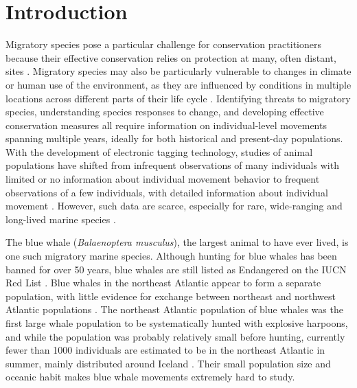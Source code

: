 \documentclass[a4paper,12pt]{article}
\begin{document}
\section{Introduction}
Migratory species pose a particular challenge for conservation practitioners because their effective conservation relies on protection at many, often distant, sites \cite{runge2014conserving}.
Migratory species may also be particularly vulnerable to changes in climate or human use of the environment, as they are influenced by conditions in multiple locations across different parts of their life cycle \cite{robinson2009travelling}. 
Identifying threats to migratory species, understanding species responses to change, and developing effective conservation measures all require information on individual-level movements spanning multiple years, ideally for both historical and present-day populations.
With the development of electronic tagging technology, studies of animal populations have shifted from infrequent observations of many individuals with limited or no information about individual movement behavior to frequent observations of a few individuals, with detailed information about individual movement \cite{holdo2013inferring}. 
However, such data are scarce, especially for rare, wide-ranging and long-lived marine species \cite{ryan2013stable,hall2005stable,bailey2009behavioural}. 
 
The blue whale (\textit{Balaenoptera musculus}), the largest animal to have ever lived, is one such migratory marine species. 
Although hunting for blue whales has been banned for over 50 years, blue whales are still listed as Endangered on the IUCN Red List \cite{reilly2008balaenoptera}.
Blue whales in the northeast Atlantic appear to form a separate population, with little evidence for exchange between northeast and northwest Atlantic populations \cite{pike2009note}.  
The northeast Atlantic population of blue whales was the first large whale population to be systematically hunted with explosive harpoons, and while the population was probably relatively small before hunting, currently fewer than 1000 individuals are estimated to be in the northeast Atlantic in summer, mainly distributed around Iceland \cite{pike2009note}.
Their small population size and oceanic habit makes blue whale movements extremely hard to study. 
\end{document}
